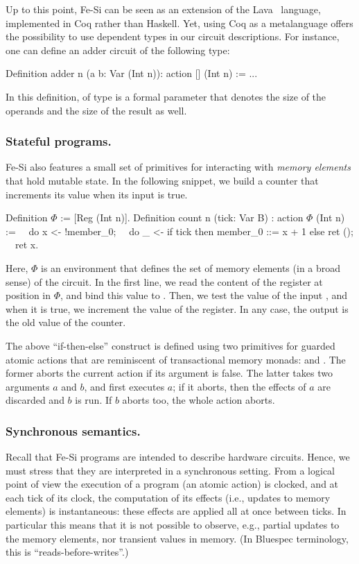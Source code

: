 \documentclass{llncs}
\begin{document}
Up to this point, Fe-Si can be seen as an extension of the
Lava~\cite{Bjesse98lava:hardware} language, implemented in Coq rather
than Haskell. Yet, using Coq as a metalanguage offers the possibility
to use dependent types in our circuit descriptions. For instance, one
can define an adder circuit of the following type:
\begin{mcoq}
Definition adder n (a b: Var (Int n)): action [] (Int n) := ...
\end{mcoq}
In this definition,  of type  is a formal parameter
that denotes the size of the operands and the size of the result as
well. 

\subsubsection{Stateful programs.}
Fe-Si also features a small set of primitives for interacting with
\emph{memory elements} that hold mutable state. In the following
snippet, we build a counter that increments its value when its input
is true.
\begin{mcoq}
Definition $\Phi$ := [Reg (Int n)].
Definition count n (tick: Var B) : action $\Phi$ (Int n) :=
$\quad$do x <- !member_0;
$\quad$do _ <- if tick then {member_0 ::= x + 1} else {ret ()}; 
$\quad$ret x. 
\end{mcoq}
Here, $\Phi$ is an environment that defines the set of memory elements
(in a broad sense) of the circuit. In the first line, we read the
content of the register at position  in $\Phi$, and
bind this value to . Then, we test the value of the input
, and when it is true, we increment the value of the
register. In any case, the output is the old value of the counter.

The above ``if-then-else'' construct is defined using two primitives
for guarded atomic actions that are reminiscent of transactional
memory monads:  and . The former aborts the
current action if its argument is false.
%
The latter takes two arguments $a$ and $b$, and first executes $a$; if
it aborts, then the effects of $a$ are discarded and $b$ is run. If
$b$ aborts too, the whole action  aborts. 


\subsubsection{Synchronous semantics.} Recall that Fe-Si programs are
intended to describe hardware circuits. Hence, we must stress that
they are interpreted in a synchronous setting.
%
From a logical point of view the execution of a program (an atomic
action) is clocked, and at each tick of its clock, the computation of
its effects (i.e., updates to memory elements) is instantaneous: these
effects are applied all at once between ticks.
%
In particular this means that it is not possible to observe, e.g.,
partial updates to the memory elements, nor transient values in
memory.
%
(In Bluespec terminology, this is ``reads-before-writes''.)
\end{document}
